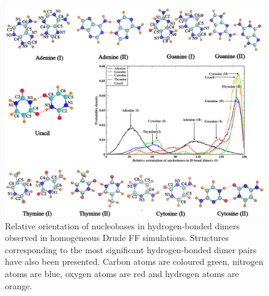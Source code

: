     \begin{figure}
        \centering
        \includegraphics[width=\textwidth]{Chapter1/Figures/hbonds_full_mod_new1.png}
        \caption[Relative orientation of nucleobases in hydrogen-bonded dimers observed in homogeneous Drude FF simulations. Structures corresponding to the most significant hydrogen-bonded dimer pairs have also been presented]{Relative orientation of nucleobases in hydrogen-bonded dimers observed in homogeneous Drude FF simulations. Structures corresponding to the most significant hydrogen-bonded dimer pairs have also been presented. Carbon atoms are coloured green, nitrogen atoms are blue, oxygen atoms are red and hydrogen atoms are orange.}
    \end{figure}
